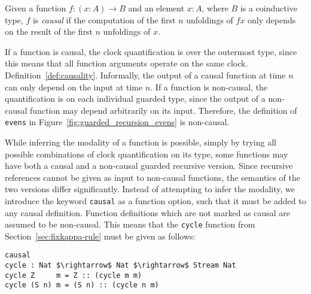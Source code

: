\begin{definition}
\label{def:causality}
  Given a function $f : (x : A) \to B$ and an element $x : A$, where $B$ is a
  coinductive type, $f$ is \emph{causal} if the computation of the first $n$
  unfoldings of $f x$ only depends on the result of the first $n$ unfoldings of $x$.
\end{definition}

If a function is causal, the clock quantification is over the
outermost type, since this means that all function arguments operate on the same
clock. Definition~\ref{def:causality}. Informally, the
output of a causal function at time $n$ can only depend on the input at time
$n$. If a function is non-causal, the quantification is on each individual
guarded type, since the output of a non-causal function may depend arbitrarily
on its input. Therefore, the definition of \texttt{evens} in
Figure~\ref{fig:guarded_recursion_evens} is non-causal.



While inferring the modality of a function is possible, simply by trying all
possible combinations of clock quantification on its type, some functions may
have both a causal and a non-causal guarded recursive version. Since recursive
references cannot be given as input to non-causal functions, the semantics of
the two versions differ significantly. Instead of attempting to infer the
modality, we introduce the keyword \texttt{causal} as a function option, such
that it must be added to any causal definition. Function definitions which are
not marked as causal are assumed to be non-causal. This means that the
\texttt{cycle} function from Section~\ref{sec:fixkappa-rule} must be given as
follows:
\begin{lstlisting}[mathescape,title=\idrisBlock]
causal 
cycle : Nat $\rightarrow$ Nat $\rightarrow$ Stream Nat
cycle Z     m = Z :: (cycle m m)
cycle (S n) m = (S n) :: (cycle n m)
\end{lstlisting}



